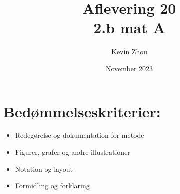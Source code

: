 \documentclass{article}
\title{Aflevering 20\\
{\Large \textbf{2.b mat A}}}
\author{Kevin Zhou}
\date{November 2023}
\begin{document}
\maketitle
\section*{Bedømmelseskriterier:}
\begin{itemize}
    \setlength\itemsep{3cm}
    \Large
    \item  Redegørelse og dokumentation for metode
    \item Figurer, grafer og andre illustrationer
    \item Notation og layout
    \item Formidling og forklaring
\end{itemize}
\pagebreak
\end{document}
